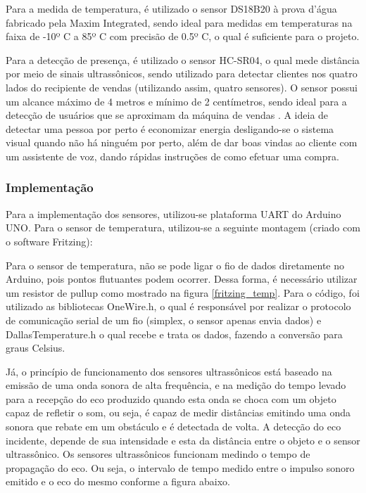 Para a medida de temperatura, é utilizado o sensor DS18B20 à prova d'água fabricado pela Maxim Integrated, sendo ideal para medidas em temperaturas na faixa de -10º C a 85º C com precisão de 0.5º C, o qual é suficiente para o projeto.

Para a detecção de presença, é utilizado o sensor HC-SR04, o qual mede distância por meio de sinais ultrassônicos, sendo utilizado para detectar clientes nos quatro lados do recipiente de vendas (utilizando assim, quatro sensores). O sensor possui um alcance máximo de 4 metros e mínimo de 2 centímetros, sendo ideal para a detecção de usuários que se aproximam da máquina de vendas \cite{mq3}. A ideia de detectar uma pessoa por perto é economizar energia desligando-se o sistema visual quando não há ninguém por perto, além de dar boas vindas ao cliente com um assistente de voz, dando rápidas instruções de como efetuar uma compra.

\subsubsection{Implementação}

Para a implementação dos sensores, utilizou-se plataforma UART do Arduino UNO. Para o sensor de temperatura, utilizou-se a seguinte montagem (criado com o software Fritzing):

Para o sensor de temperatura, não se pode ligar o fio de dados diretamente no Arduino, pois pontos flutuantes podem ocorrer. Dessa forma, é necessário utilizar um resistor de pullup como mostrado na figura \ref{fritzing_temp}. Para o código, foi utilizado as bibliotecas OneWire.h, o qual é responsável por realizar o protocolo de comunicação serial de um fio (simplex, o sensor apenas envia dados) e DallasTemperature.h o qual recebe e trata os dados, fazendo a conversão para graus Celsius.

Já, o princípio de funcionamento dos sensores ultrassônicos está baseado na emissão de uma onda sonora de alta frequência, e na medição do tempo levado para a recepção do eco produzido quando esta onda se choca com um objeto capaz de refletir o som, ou seja, é capaz de medir distâncias emitindo uma onda sonora que rebate em um obstáculo e é detectada de volta. A detecção do eco incidente, depende de sua intensidade e esta da distância entre o objeto e o sensor ultrassônico. Os sensores ultrassônicos funcionam medindo o tempo de propagação do eco. Ou seja, o intervalo de tempo medido entre o impulso sonoro emitido e o eco do
mesmo conforme a figura abaixo.

